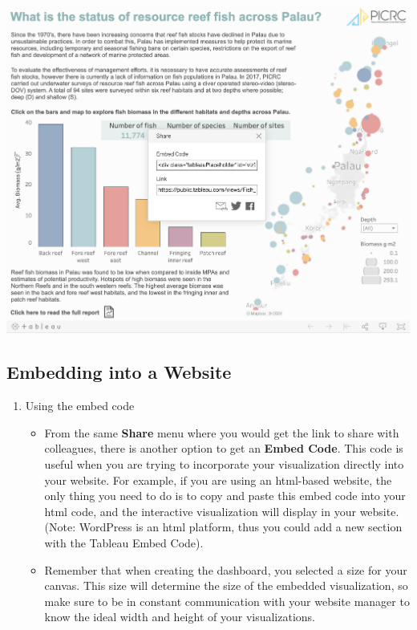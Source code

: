 \documentclass[
]{book}
\providecommand{\tightlist}{%
  \setlength{\itemsep}{0pt}\setlength{\parskip}{0pt}}
\begin{document}
\includegraphics{images/M3S7_tableau_public_link.png}

\hypertarget{embedding-into-a-website}{%
\subsection{Embedding into a Website}\label{embedding-into-a-website}}

\begin{enumerate}
\def\labelenumi{\arabic{enumi}.}
\tightlist
\item
  Using the embed code

  \begin{itemize}
  \tightlist
  \item
    From the same \textbf{Share} menu where you would get the link to share with colleagues, there is another option to get an \textbf{Embed Code}. This code is useful when you are trying to incorporate your visualization directly into your website. For example, if you are using an html-based website, the only thing you need to do is to copy and paste this embed code into your html code, and the interactive visualization will display in your website. (Note: WordPress is an html platform, thus you could add a new section with the Tableau Embed Code).
  \item
    Remember that when creating the dashboard, you selected a size for your canvas. This size will determine the size of the embedded visualization, so make sure to be in constant communication with your website manager to know the ideal width and height of your visualizations.
  \end{itemize}
\end{enumerate}
\end{document}
